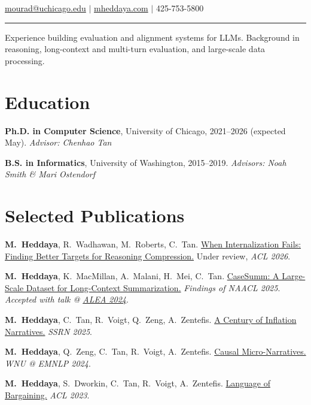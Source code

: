 \documentclass[11pt,letterpaper]{article}
\begin{document}
\hfill{\normalsize \href{mailto:mourad@uchicago.edu}{mourad@uchicago.edu} $|$ \href{https://mheddaya.com}{mheddaya.com} $|$ 425-753-5800}
\vspace{2pt}
\hrule

\vspace{12pt}
\noindent Experience building evaluation and alignment systems for LLMs.
Background in reasoning, long-context and multi-turn evaluation, and large-scale data processing.

\section*{Education}

\noindent\textbf{Ph.D. in Computer Science}, University of Chicago, 2021--2026 (expected May). \textit{Advisor: Chenhao Tan}

\vspace{4pt}

\noindent\textbf{B.S. in Informatics}, University of Washington, 2015--2019. \textit{Advisors: Noah Smith \& Mari Ostendorf}

\section*{Selected Publications}
\vspace{4pt}
\begin{enumerate}[label={[\arabic*]}, leftmargin=2em, topsep=2pt, itemsep=1pt, parsep=0pt]
    \item \textbf{M.\ Heddaya}, R.\ Wadhawan, M.\ Roberts, C.\ Tan. \href{https://mheddaya.com/papers/acl2026_abridge.pdf}{When Internalization Fails: Finding Better Targets for Reasoning Compression.} Under review, \textit{ACL 2026}.
    \item \textbf{M.\ Heddaya}, K.\ MacMillan, A.\ Malani, H.\ Mei, C.\ Tan. \href{https://arxiv.org/abs/2501.00097}{CaseSumm: A Large-Scale Dataset for Long-Context Summarization.} \textit{Findings of NAACL 2025}. \textit{Accepted with talk @ \href{https://www.amlecon.org}{ALEA 2024}}.
    \item \textbf{M.\ Heddaya}, C.\ Tan, R.\ Voigt, Q.\ Zeng, A.\ Zentefis. \href{https://papers.ssrn.com/sol3/papers.cfm?abstract_id=5259107}{A Century of Inflation Narratives.} \textit{SSRN 2025}.
    \item \textbf{M.\ Heddaya}, Q.\ Zeng, C.\ Tan, R.\ Voigt, A.\ Zentefis. \href{https://aclanthology.org/2024.wnu-1.12/}{Causal Micro-Narratives.} \textit{WNU @ EMNLP 2024}.
    \item \textbf{M.\ Heddaya}, S.\ Dworkin, C.\ Tan, R.\ Voigt, A.\ Zentefis. \href{https://aclanthology.org/2023.acl-long.735/}{Language of Bargaining.} \textit{ACL 2023}.
\end{enumerate}
\end{document}
